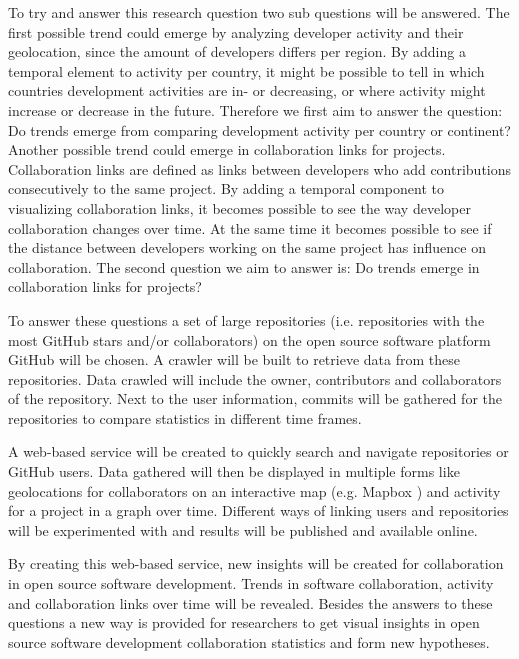 \documentclass[acmtog, authorversion]{acmart}
\begin{document}
To try and answer this research question two sub questions will be answered. 
The first possible trend could emerge by analyzing developer activity and their geolocation, since the amount of developers differs per region.
By adding a temporal element to activity per country, it might be possible to tell in which countries development activities are in- or decreasing, or where activity might increase or decrease in the future.
Therefore we first aim to answer the question: Do trends emerge from comparing development activity per country or continent?
Another possible trend could emerge in collaboration links for projects.
Collaboration links are defined as links between developers who add contributions consecutively to the same project.
By adding a temporal component to visualizing collaboration links, it becomes possible to see the way developer collaboration changes over time.
At the same time it becomes possible to see if the distance between developers working on the same project has influence on collaboration.
The second question we aim to answer is: Do trends emerge in collaboration links for projects?

To answer these questions a set of large repositories (i.e. repositories with the most GitHub stars and/or collaborators) on the open source software platform GitHub will be chosen.
A crawler will be built to retrieve data from these repositories.
Data crawled will include the owner, contributors and collaborators of the repository.
Next to the user information, commits will be gathered for the repositories to compare statistics in different time frames.

A web-based service will be created to quickly search and navigate repositories or GitHub users.
Data gathered will then be displayed in multiple forms like geolocations for collaborators on an interactive map (e.g. Mapbox \cite{MapBox}) and activity for a project in a graph over time.
Different ways of linking users and repositories will be experimented with and results will be published and available online.

By creating this web-based service, new insights will be created for collaboration in open source software development.
Trends in software collaboration, activity and collaboration links over time will be revealed.
Besides the answers to these questions a new way is provided for researchers to get visual insights in open source software development collaboration statistics and form new hypotheses.



\end{document}

